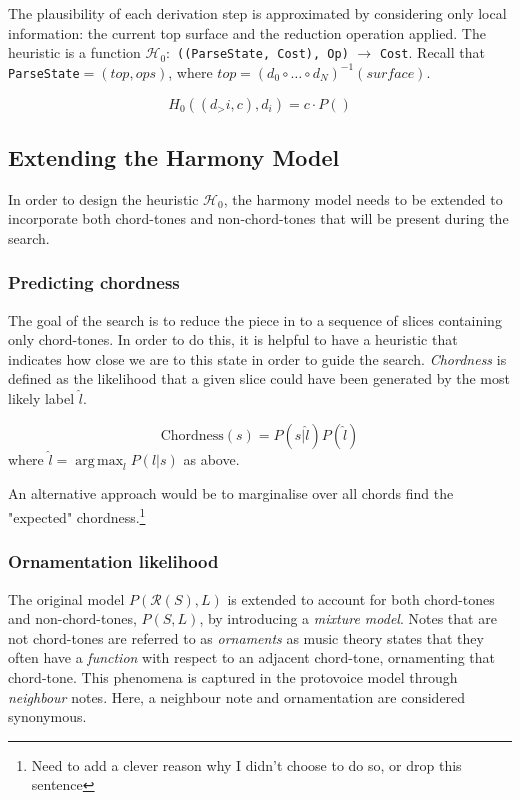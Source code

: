 \documentclass[12pt,a4paper,twoside,openright]{report} \usepackage[pdfborder={0 0 0}]{hyperref}    %
\DeclareMathOperator*{\argmax}{arg\,max} \DeclareMathOperator*{\argmin}{arg\,min}
\theoremstyle{definition} \newtheorem{definition}{Definition}[section]
\begin{document}
  The plausibility of each derivation step is approximated by considering only local information: the current top
  surface and the reduction operation applied. The heuristic is a function $\mathcal{H_0}:$ \texttt{((ParseState, Cost),
  Op)} $\to$ \texttt{Cost}. Recall that \texttt{ParseState}$=(top,ops)$, where $top = (d_0 \circ \dots \circ d_N)^{-1}
  (surface)$.

  \begin{equation} H_0 ((d_>i, c), d_i) = c \cdot P() \label{eq:heuristic} \end{equation}

  \subsection{Extending the Harmony Model} In order to design the heuristic $\mathcal{H}_0$, the harmony model needs to
  be extended to incorporate both chord-tones and non-chord-tones that will be present during the search.

  \subsubsection{Predicting chordness} The goal of the search is to reduce the piece in to a sequence of slices
  containing only chord-tones. In order to do this, it is helpful to have a heuristic that indicates how close we are to
  this state in order to guide the search. \textit{Chordness} is defined as the likelihood that a given slice could have
  been generated by the most likely label $\hat{l}$. 

  \begin{equation} \text{Chordness}(s) = P(s | \hat{l}) P(\hat{l}) \label{eq:chordness} \end{equation} where $\hat{l}
  = \argmax_l P(l | s)$ as above.

  An alternative approach would be to marginalise over all chords find the "expected" chordness.\footnote{Need to add
  a clever reason why I didn't choose to do so, or drop this sentence} 

  \subsubsection{Ornamentation likelihood} The original model $P(\mathcal{R}(S),L)$ is extended to account for both
  chord-tones and non-chord-tones, $P(S,L)$, by introducing a \textit{mixture model}. Notes that are not chord-tones are
  referred to as \textit{ornaments} as music theory states that they often have a \textit{function} with respect to an
  adjacent chord-tone, ornamenting that chord-tone. This phenomena is captured in the protovoice model through
  \textit{neighbour} notes. Here, a neighbour note and ornamentation are considered synonymous. 
\end{document}
